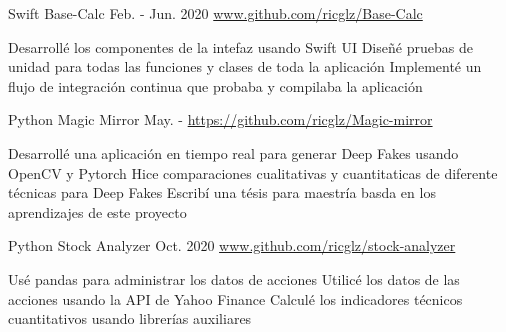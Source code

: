 \begin{cventries}
  \cventry
    {Swift}
    {Base-Calc} %
    {Feb. - Jun. 2020} %
    {\url{www.github.com/ricglz/Base-Calc}} %
    {
      \begin{cvitems} %
         {{
          Desarrollé los componentes de la intefaz usando Swift UI
        }}
         {{
          Diseñé pruebas de unidad para todas las funciones y clases de toda la aplicación
        }}
         {{
          Implementé un flujo de integración continua que probaba y compilaba la aplicación
        }}
      \end{cvitems}
    }

  \cventry
    {Python}
    {Magic Mirror} %
    {May. - } %
    {\url{https://github.com/ricglz/Magic-mirror}} %
    {
      \begin{cvitems} %
         {{
          Desarrollé una aplicación en tiempo real para generar Deep Fakes usando OpenCV y Pytorch
        }}
         {{
          Hice comparaciones cualitativas y cuantitaticas de diferente técnicas para Deep Fakes
        }}
         {{
          Escribí una tésis para maestría basda en los aprendizajes de este proyecto
        }}
      \end{cvitems}
    }
  \cventry
    {Python}
    {Stock Analyzer} %
    {Oct. 2020} %
    {\url{www.github.com/ricglz/stock-analyzer}} %
    {
      \begin{cvitems} %
         {{
          Usé pandas para administrar los datos de acciones
        }}
         {{
          Utilicé los datos de las acciones usando la API de Yahoo Finance
        }}
         {{
          Calculé los indicadores técnicos cuantitativos usando librerías auxiliares
        }}
      \end{cvitems}
    }


\end{cventries}
